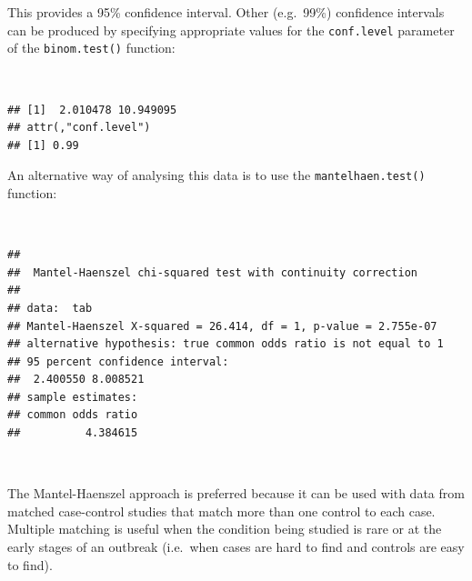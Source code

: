 \documentclass[12pt,a4paper]{book}
\newenvironment{Shaded}{\begin{snugshade}}{\end{snugshade}}
\newcommand{\KeywordTok}[1]{\textcolor[rgb]{0.13,0.29,0.53}{\textbf{#1}}}
\newcommand{\DataTypeTok}[1]{\textcolor[rgb]{0.13,0.29,0.53}{#1}}
\newcommand{\DecValTok}[1]{\textcolor[rgb]{0.00,0.00,0.81}{#1}}
\newcommand{\FloatTok}[1]{\textcolor[rgb]{0.00,0.00,0.81}{#1}}
\newcommand{\StringTok}[1]{\textcolor[rgb]{0.31,0.60,0.02}{#1}}
\newcommand{\OperatorTok}[1]{\textcolor[rgb]{0.81,0.36,0.00}{\textbf{#1}}}
\newcommand{\NormalTok}[1]{#1}
\theoremstyle{definition}
\theoremstyle{definition}
\theoremstyle{definition}
\theoremstyle{remark}
\begin{document}
This provides a 95\% confidence interval. Other (e.g.~99\%) confidence
intervals can be produced by specifying appropriate values for the
\texttt{conf.level} parameter of the \texttt{binom.test()} function:

~

\begin{Shaded}
\end{Shaded}

\begin{verbatim}
## [1]  2.010478 10.949095
## attr(,"conf.level")
## [1] 0.99
\end{verbatim}

\newpage

An alternative way of analysing this data is to use the
\texttt{mantelhaen.test()} function:

~

\begin{Shaded}
\end{Shaded}

\begin{verbatim}
## 
##  Mantel-Haenszel chi-squared test with continuity correction
## 
## data:  tab
## Mantel-Haenszel X-squared = 26.414, df = 1, p-value = 2.755e-07
## alternative hypothesis: true common odds ratio is not equal to 1
## 95 percent confidence interval:
##  2.400550 8.008521
## sample estimates:
## common odds ratio 
##          4.384615
\end{verbatim}

~

The Mantel-Haenszel approach is preferred because it can be used with
data from matched case-control studies that match more than one control
to each case. Multiple matching is useful when the condition being
studied is rare or at the early stages of an outbreak (i.e.~when cases
are hard to find and controls are easy to find).
\end{document}
